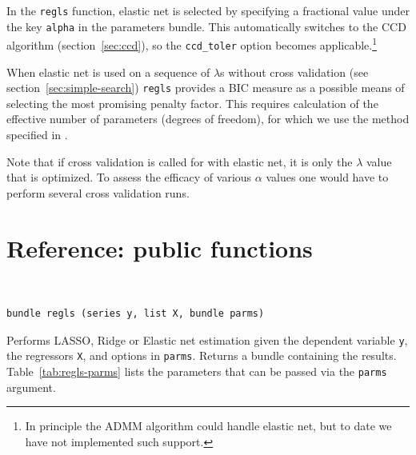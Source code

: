 \documentclass{article}
\newenvironment{funcdoc}
{\noindent\hrulefill\\[-12pt]}
{\medbreak}
\begin{document}
In the \texttt{regls} function, elastic net is selected by specifying
a fractional value under the key \texttt{alpha} in the parameters
bundle. This automatically switches to the CCD algorithm
(section~\ref{sec:ccd}), so the \texttt{ccd\_toler} option becomes
applicable.\footnote{In principle the ADMM algorithm could handle
  elastic net, but to date we have not implemented such support.}

When elastic net is used on a sequence of $\lambda$s without cross
validation (see section~\ref{sec:simple-search}) \texttt{regls}
provides a BIC measure as a possible means of selecting the most
promising penalty factor. This requires calculation of the effective
number of parameters (degrees of freedom), for which we use the method
specified in \cite{zou-hastie05}.

Note that if cross validation is called for with elastic net, it is
only the $\lambda$ value that is optimized. To assess the efficacy of
various $\alpha$ values one would have to perform several cross
validation runs.

\section{Reference: public functions}
\label{sec:funcref}

\begin{funcdoc}
\begin{verbatim}
bundle regls (series y, list X, bundle parms)
\end{verbatim}
  Performs LASSO, Ridge or Elastic net estimation given the dependent
  variable \texttt{y}, the regressors \texttt{X}, and options in
  \texttt{parms}. Returns a bundle containing the
  results. Table~\ref{tab:regls-parms} lists the parameters that can
  be passed via the \texttt{parms} argument.
\end{funcdoc}
\end{document}
